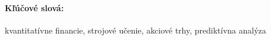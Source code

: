 \documentclass[12pt, oneside]{book}  %
\begin{document}
\paragraph*{Kľúčové slová:} kvantitatívne financie, strojové učenie, akciové trhy, prediktívna analýza


%
%
%
%



\cleardoublepage 

\tableofcontents



\newpage 


\mainmatter
\pagestyle{headings}

 













%



\newpage	

\backmatter

\thispagestyle{empty}
\clearpage
{}

 



%

\end{document}
